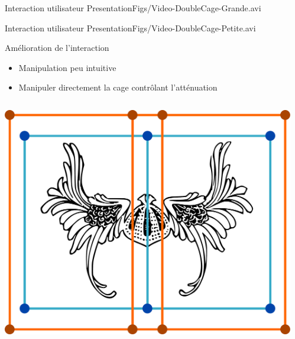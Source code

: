 \documentclass[xcolor=x11names,compress]{beamer}
\renewcommand{\(}{\begin{columns}} \renewcommand{\)}{\end{columns}}
\newcommand{\<}[1]{\begin{column}{#1}} \renewcommand{\>}{\end{column}}
\begin{document}
\begin{frame}{Interaction utilisateur}
\centering
\movie[width=0.9\textwidth,height=0.5\paperwidth,poster,repeat,autostart]{}
{PresentationFigs/Video-DoubleCage-Grande.avi}
\end{frame}

\begin{frame}{Interaction utilisateur}
\centering
\movie[width=0.9\textwidth,height=0.5\paperwidth,poster,repeat,autostart]{}
{PresentationFigs/Video-DoubleCage-Petite.avi}
\end{frame}

\begin{frame}{Amélioration de l'interaction}
  \begin{itemize}
    \item Manipulation peu intuitive
    \item Manipuler directement la cage contrôlant l'atténuation
  \end{itemize}
  \begin{columns}[t]
    \begin{column}{0.5\textwidth}
      \centering
      \includegraphics[scale=0.15]{Deformation-Viking-Avant}
    \end{column}
    \begin{column}{0.5\textwidth}
      \centering

\end{column}
\end{columns}
\end{frame}
\end{document}
